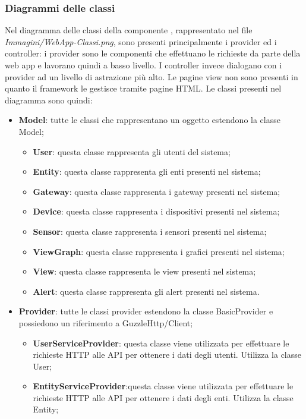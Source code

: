 	\subsubsection{Diagrammi delle classi}%
	Nel diagramma delle classi della componente , rappresentato nel file \textit{Immagini/WebApp-Classi.png}, sono presenti principalmente i provider ed i controller: i provider sono le componenti che effettuano le richieste  da parte della web app e lavorano quindi a basso livello.
	\newline
	I controller invece dialogano con i provider ad un livello di astrazione più alto. Le pagine view non sono presenti in quanto il framework  le gestisce tramite pagine HTML.
	Le classi presenti nel diagramma sono quindi:
	\begin{itemize}
		\item \textbf{Model}: tutte le classi che rappresentano un oggetto estendono la classe Model;
		\begin{itemize}
			\item \textbf{User}: questa classe rappresenta gli utenti del sistema;
			\item \textbf{Entity}: questa classe rappresenta gli enti presenti nel sistema;
			\item \textbf{Gateway}: questa classe rappresenta i gateway presenti nel sistema;
			\item \textbf{Device}: questa classe rappresenta i dispositivi presenti nel sistema;
			\item \textbf{Sensor}: questa classe rappresenta i sensori presenti nel sistema;
			\item \textbf{ViewGraph}: questa classe rappresenta i grafici presenti nel sistema;
			\item \textbf{View}: questa classe rappresenta le view presenti nel sistema;
			\item \textbf{Alert}: questa classe rappresenta gli alert presenti nel sistema.
		\end{itemize}
		\item \textbf{Provider}: tutte le classi provider estendono la classe BasicProvider e possiedono un riferimento a GuzzleHttp/Client;
		\begin{itemize}
			\item \textbf{UserServiceProvider}: questa classe viene utilizzata per effettuare le richieste HTTP alle API per ottenere i dati degli utenti. Utilizza la classe User;
			\item \textbf{EntityServiceProvider}:questa classe viene utilizzata per effettuare le richieste HTTP alle API per ottenere i dati degli enti. Utilizza la classe Entity;

\end{itemize}
\end{itemize}
